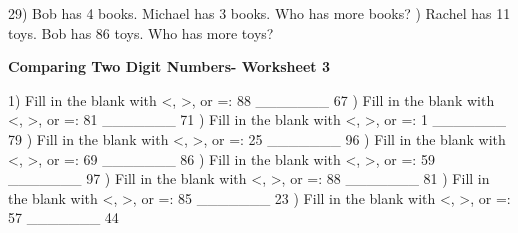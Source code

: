 \documentclass{article}%
\begin{document}
29) Bob has 4 books. Michael has 3 books. Who has more books?%
\newline%
\newline%
) Rachel has 11 toys. Bob has 86 toys. Who has more toys?%
\newline%
\newline%
\newline%
\pagebreak%
\large%
\begin{center}%
\textbf{Comparing Two Digit Numbers- Worksheet 3}%
\newline%
\newline%
\newline%
\end{center} \normalsize%
1) Fill in the blank with <, >, or =: 88 \_\_\_\_\_\_\_ 67%
\newline%
\newline%
) Fill in the blank with <, >, or =: 81 \_\_\_\_\_\_\_ 71%
\newline%
\newline%
) Fill in the blank with <, >, or =: 1 \_\_\_\_\_\_\_ 79%
\newline%
\newline%
) Fill in the blank with <, >, or =: 25 \_\_\_\_\_\_\_ 96%
\newline%
\newline%
) Fill in the blank with <, >, or =: 69 \_\_\_\_\_\_\_ 86%
\newline%
\newline%
) Fill in the blank with <, >, or =: 59 \_\_\_\_\_\_\_ 97%
\newline%
\newline%
) Fill in the blank with <, >, or =: 88 \_\_\_\_\_\_\_ 81%
\newline%
\newline%
) Fill in the blank with <, >, or =: 85 \_\_\_\_\_\_\_ 23%
\newline%
\newline%
) Fill in the blank with <, >, or =: 57 \_\_\_\_\_\_\_ 44%
\newline%
\newline%
\end{document}
